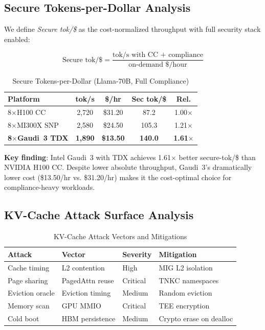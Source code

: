 \documentclass[conference,10pt]{IEEEtran}
\begin{document}
\subsection{Secure Tokens-per-Dollar Analysis}

We define \emph{Secure tok/\$} as the cost-normalized throughput with full security stack enabled:

\begin{equation}
\text{Secure tok/\$} = \frac{\text{tok/s with CC + compliance}}{\text{on-demand \$/hour}}
\end{equation}

\begin{table}[!htbp]
\caption{Secure Tokens-per-Dollar (Llama-70B, Full Compliance)}
\label{tab:sectokdollar}
\centering\footnotesize
\begin{tabular}{@{}lcccc@{}}
\toprule
\textbf{Platform} & \textbf{tok/s} & \textbf{\$/hr} & \textbf{Sec tok/\$} & \textbf{Rel.} \\
\midrule
8$\times$H100 CC & 2,720 & \$31.20 & 87.2 & 1.00$\times$ \\
8$\times$MI300X SNP & 2,580 & \$24.50 & 105.3 & 1.21$\times$ \\
\textbf{8$\times$Gaudi~3 TDX} & \textbf{1,890} & \textbf{\$13.50} & \textbf{140.0} & \textbf{1.61$\times$} \\
\bottomrule
\end{tabular}
\end{table}

\textbf{Key finding}: Intel Gaudi~3 with TDX achieves 1.61$\times$ better secure-tok/\$ than NVIDIA H100 CC. Despite lower absolute throughput, Gaudi~3's dramatically lower cost (\$13.50/hr vs. \$31.20/hr) makes it the cost-optimal choice for compliance-heavy workloads.

\subsection{KV-Cache Attack Surface Analysis}

\begin{table}[!htbp]
\caption{KV-Cache Attack Vectors and Mitigations}
\label{tab:kvattack}
\centering\footnotesize
\begin{tabular}{@{}lp{1.5cm}p{1.2cm}p{1.8cm}@{}}
\toprule
\textbf{Attack} & \textbf{Vector} & \textbf{Severity} & \textbf{Mitigation} \\
\midrule
Cache timing & L2 contention & High & MIG L2 isolation \\
Page sharing & PagedAttn reuse & Critical & TNKC namespaces \\
Eviction oracle & Eviction timing & Medium & Random eviction \\
Memory scan & GPU MMIO & Critical & TEE encryption \\
Cold boot & HBM persistence & Medium & Crypto erase on dealloc \\
\bottomrule
\end{tabular}
\end{table}
\end{document}
